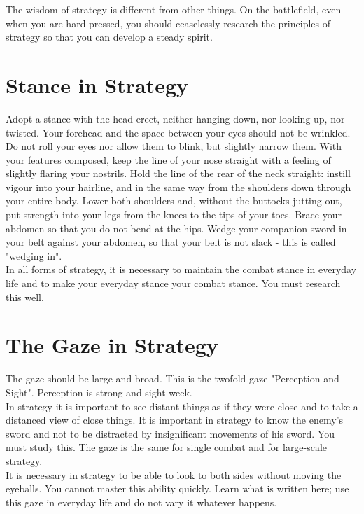 The wisdom of strategy is different from other things. On the battlefield, even when you are hard-pressed, you should ceaselessly research the principles of strategy so that you can develop a steady spirit.\\
\section{Stance in Strategy}

Adopt a stance with the head erect, neither hanging down, nor looking up, nor twisted. Your forehead and the space between your eyes should not be wrinkled. Do not roll your eyes nor allow them to blink, but slightly narrow them. With your features composed, keep the line of your nose straight with a feeling of slightly flaring your nostrils. Hold the line of the rear of the neck straight: instill vigour into your hairline, and in the same way from the shoulders down through your entire body. Lower both shoulders and, without the buttocks jutting out, put strength into your legs from the knees to the tips of your toes. Brace your abdomen so that you do not bend at the hips. Wedge your companion sword in your belt against your abdomen, so that your belt is not slack - this is called "wedging in".\\

In all forms of strategy, it is necessary to maintain the combat stance in everyday life and to make your everyday stance your combat stance. You must research this well.\\
\section{The Gaze in Strategy}

The gaze should be large and broad. This is the twofold gaze "Perception and Sight". Perception is strong and sight week.\\

In strategy it is important to see distant things as if they were close and to take a distanced view of close things. It is important in strategy to know the enemy's sword and not to be distracted by insignificant movements of his sword. You must study this. The gaze is the same for single combat and for large-scale strategy.\\

It is necessary in strategy to be able to look to both sides without moving the eyeballs. You cannot master this ability quickly. Learn what is written here; use this gaze in everyday life and do not vary it whatever happens.\\
